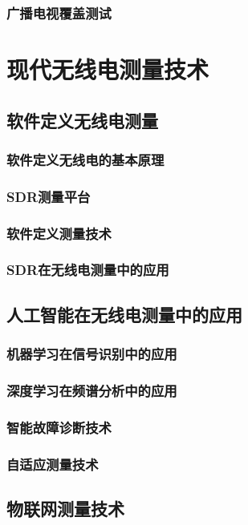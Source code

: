 \documentclass[12pt,UTF8]{ctexbook}
\begin{document}
\section{广播电视覆盖测试}

\part{现代无线电测量技术}

\chapter{软件定义无线电测量}
\section{软件定义无线电的基本原理}
\section{SDR测量平台}
\section{软件定义测量技术}
\section{SDR在无线电测量中的应用}

\chapter{人工智能在无线电测量中的应用}
\section{机器学习在信号识别中的应用}
\section{深度学习在频谱分析中的应用}
\section{智能故障诊断技术}
\section{自适应测量技术}

\chapter{物联网测量技术}
\end{document}
